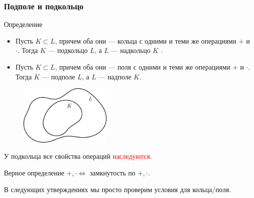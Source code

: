 \begin{frame}[t]
    \frametitle{\normalsize \bf Подполе и подкольцо}
    \small
    \begin{block}{Определение}
        \begin{itemize}
            \item Пусть $K \subset L$, причем оба они — кольца с одними и
теми же операциями $+$ и $\cdot $. Тогда $K$ — подкольцо $L$, а $L$
— надкольцо $K$ .
    \item  
 Пусть $K \subset L$, причем оба они — поля с одними и теми
же операциями $+$ и $\cdot $. Тогда $K$ — подполе $L$, а $L$ —
надполе $K$.
        \end{itemize}
    \begin{figure}
        \centering
        \includegraphics[width=0.4\textwidth]{images/path1}
        \label{fig:path1}
    \end{figure}
    
    У подкольца все свойства операций \textcolor{red}{наследуются}.

    Верное определение $+, \cdot \iff$ замкнутость по $+, \cdot $. 

    В следующих утверждениях мы просто проверим условия для кольца/поля. 
\end{block}

\end{frame}

